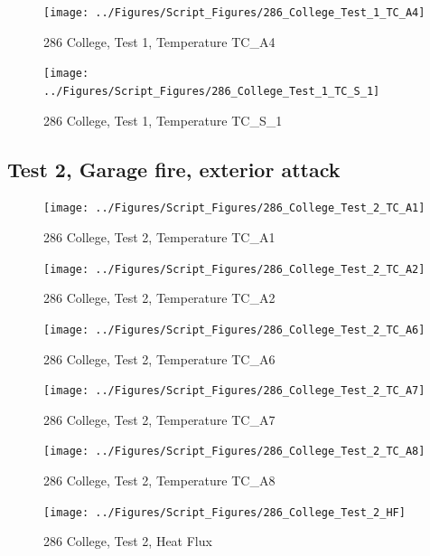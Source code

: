 \documentclass[12pt,oneside]{book}
\begin{document}
\begin{figure}[!ht]
\texttt{[image: ../Figures/Script\_Figures/286\_College\_Test\_1\_TC\_A4]}
\caption{286 College, Test 1, Temperature TC\_A4}
\label{fig:286_College_Test_1_TC_A4}
\end{figure}

\begin{figure}[!ht]
\texttt{[image: ../Figures/Script\_Figures/286\_College\_Test\_1\_TC\_S\_1]}
\caption{286 College, Test 1, Temperature TC\_S\_1}
\label{fig:286_College_Test_1_TC_S_1}
\end{figure}


\clearpage


\subsection{Test 2, Garage fire, exterior attack}

\begin{figure}[!ht]
\texttt{[image: ../Figures/Script\_Figures/286\_College\_Test\_2\_TC\_A1]}
\caption{286 College, Test 2, Temperature TC\_A1}
\label{fig:286_College_Test_2_TC_A1}
\end{figure}

\begin{figure}[!ht]
\texttt{[image: ../Figures/Script\_Figures/286\_College\_Test\_2\_TC\_A2]}
\caption{286 College, Test 2, Temperature TC\_A2}
\label{fig:286_College_Test_2_TC_A2}
\end{figure}

\begin{figure}[!ht]
\texttt{[image: ../Figures/Script\_Figures/286\_College\_Test\_2\_TC\_A6]}
\caption{286 College, Test 2, Temperature TC\_A6}
\label{fig:286_College_Test_2_TC_A6}
\end{figure}

\begin{figure}[!ht]
\texttt{[image: ../Figures/Script\_Figures/286\_College\_Test\_2\_TC\_A7]}
\caption{286 College, Test 2, Temperature TC\_A7}
\label{fig:286_College_Test_2_TC_A7}
\end{figure}

\begin{figure}[!ht]
\texttt{[image: ../Figures/Script\_Figures/286\_College\_Test\_2\_TC\_A8]}
\caption{286 College, Test 2, Temperature TC\_A8}
\label{fig:286_College_Test_2_TC_A8}
\end{figure}

\begin{figure}[!ht]
\texttt{[image: ../Figures/Script\_Figures/286\_College\_Test\_2\_HF]}
\caption{286 College, Test 2, Heat Flux}
\label{fig:286_College_Test_2_HF}
\end{figure}
\end{document}
